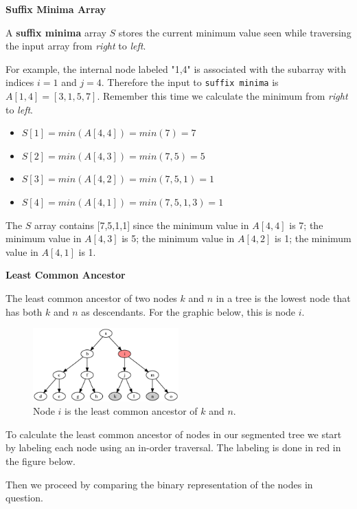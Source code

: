 \documentclass[twoside]{article}
\begin{document}
{\large \textbf{Suffix Minima Array}}

A \textbf{suffix minima} array \textbf{$S$} stores the current minimum value seen while traversing the input array from \textit{right} to \textit{left}.

For example, the internal node labeled "1,4" is associated with the subarray with indices $i=1$ and $j=4$. Therefore the input to \texttt{suffix minima} is $A[1,4] = [3,1,5,7]$. Remember this time we calculate the minimum from \textit{right} to \textit{left}.
\begin{itemize}
  \item $S[1] = min(A[4,4]) = min(7) = 7$
  \item $S[2] = min(A[4,3]) = min(7,5) = 5$
  \item $S[3] = min(A[4,2]) = min(7,5,1) = 1$
  \item $S[4] = min(A[4,1]) = min(7,5,1,3) = 1$
\end{itemize}


The $S$ array contains [7,5,1,1] since the minimum value in $A[4,4]$ is 7; the minimum value in $A[4,3]$ is 5; the minimum value in $A[4,2]$ is 1; the minimum value in $A[4,1]$ is 1.


\vspace{20pt}

\newpage
{\large \textbf{Least Common Ancestor}}

The least common ancestor of two nodes $k$ and $n$ in a tree is the lowest node that has both $k$ and $n$ as descendants. For the graphic below, this is node $i$.

\begin{figure}[h]
\centering
\includegraphics[width=0.50\textwidth]{LCA.png}
\caption{Node \textbf{$i$} is the least common ancestor of \textbf{$k$} and \textbf{$n$}.}
\end{figure}

To calculate the least common ancestor of nodes in our segmented tree we start by labeling each node using an in-order traversal.  The labeling is done in red in the figure below.

Then we proceed by comparing the binary representation of the nodes in question.
\end{document}
